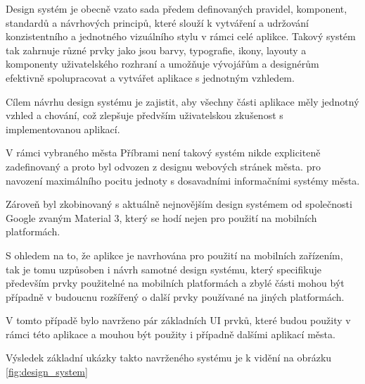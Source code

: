 Design systém je obecně vzato sada předem definovaných pravidel, komponent, standardů a návrhových principů, které slouží k vytváření a udržování 
konzistentního a jednotného vizuálního stylu v rámci celé aplikce. Takový systém tak zahrnuje různé prvky jako jsou barvy, typografie, ikony,
layouty a komponenty uživatelského rozhraní a umožňuje vývojářům a designérům efektivně spolupracovat a vytvářet aplikace s jednotným 
vzhledem. 
 
Cílem návrhu design systému je zajistit, aby všechny části aplikace měly jednotný vzhled a chování, což zlepšuje předvším uživatelskou 
zkušenost s implementovanou aplikací. 



V rámci vybraného města Příbrami není takový systém nikde expliciteně zadefinovaný a proto byl odvozen z designu webových stránek města.
pro navození maximálního pocitu jednoty s dosavadními informačními systémy města.

Zároveň byl zkobinovaný s aktuálně nejnovějším design systémem od společnosti Google zvaným Material 3, který se hodí nejen pro použití
na mobilních platformách.

S ohledem na to, že aplikce je navrhována pro použití na mobilních zařízením, tak je tomu uzpůsoben i návrh samotné design systému, který
specifikuje především prvky použitelné na mobilních platformách a zbylé části mohou být případně v budoucnu rozšířený o další prvky 
používané na jiných platformách.

V tomto případě bylo navrženo pár základních UI prvků, které budou použity v rámci této aplikace a mouhou být použity i případně dalšími 
aplikací města.

Výsledek základní ukázky takto navrženého systému je k vidění na obrázku \ref{fig:design_system}

